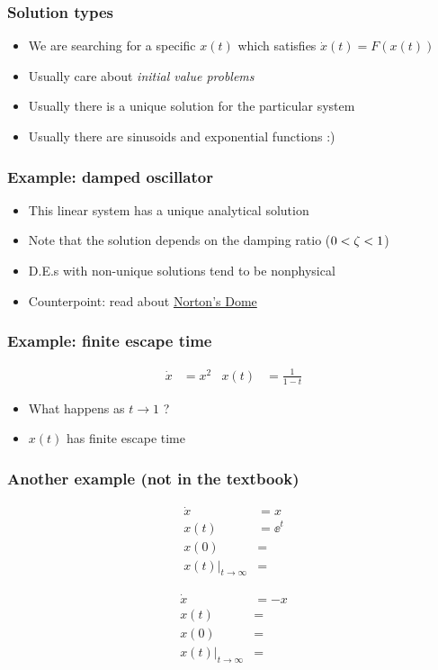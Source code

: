 \documentclass[10pt]{beamer-control}
\begin{document}
\begin{frame}
  \frametitle{Solution types}
  \begin{itemize}
    \item We are searching for a specific $x(t)$ which satisfies $\dot x(t)=F(x(t))$
    \item Usually care about \emph{initial value problems}
    \item Usually there is a unique solution for the particular system
    \item Usually there are sinusoids and exponential functions :)
  \end{itemize}
\end{frame}

\begin{frame}
  \frametitle{Example: damped oscillator}
  \begin{itemize}
    \item This linear system has a unique analytical solution
    \item Note that the solution depends on the damping ratio ($0<\zeta<1$)
    \item D.E.s with non-unique solutions tend to be nonphysical
    \item Counterpoint: read about \href{https://en.wikipedia.org/wiki/Norton\%27s_dome}{Norton's Dome}
  \end{itemize}
\end{frame}

\begin{frame}
  \frametitle{Example: finite escape time}
  \begin{align}
    \dot x &= x^2 & x(t) &= \frac{1}{1-t}
  \end{align}
  \begin{itemize}
    \item What happens as $t\to1$ ?
    \item $x(t)$ has finite escape time
  \end{itemize}
\end{frame}

\begin{frame}
  \frametitle{Another example (not in the textbook)}
  \begin{align}
    \dot x &= x \\
    x(t)   &= \ee^{t} \\
    x(0)   &= \\
    x(t)|_{t\to\infty}&=
  \end{align}

  \vfill
  \hrulefill
  \vfill

  \begin{align}
    \dot x &= -x \\
    x(t)   &=  \\
    x(0)   &= \\
    x(t)|_{t\to\infty}&=
  \end{align}
\end{frame}


\SUMMARYFRAME
\FINALE
\end{document}
